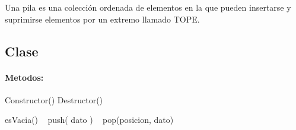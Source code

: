 Una pila es una colección ordenada de elementos en la que pueden insertarse y suprimirse elementos por un extremo llamado T\+O\+PE.

\subsection*{Clase}

\paragraph*{Metodos\+:}

Constructor() Destructor()

es\+Vacia() ~\newline
push( dato ) ~\newline
pop(posicion, dato) 